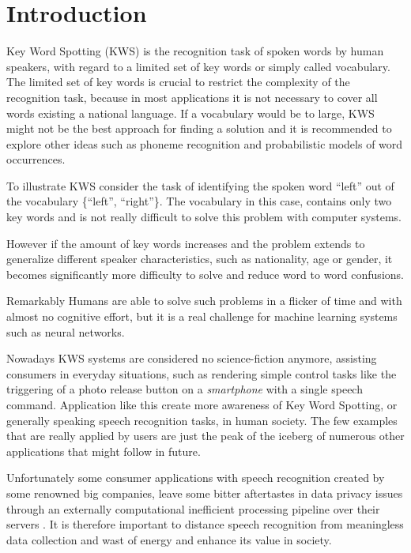 
\chapter{Introduction}\label{sec:intro}
Key Word Spotting (KWS) is the recognition task of spoken words by human speakers, with regard to a limited set of key words or simply called vocabulary.
The limited set of key words is crucial to restrict the complexity of the recognition task, because in most applications it is not necessary to cover all words existing a national language.
If a vocabulary would be to large, KWS might not be the best approach for finding a solution and it is recommended to explore other ideas such as phoneme recognition and probabilistic models of word occurrences.

To illustrate KWS consider the task of identifying the spoken word \enquote{left} out of the vocabulary \{\enquote{left}, \enquote{right}\}.
The vocabulary in this case, contains only two key words and is not really difficult to solve this problem with computer systems.

However if the amount of key words increases and the problem extends to generalize different speaker characteristics, such as nationality, age or gender, it becomes significantly more difficulty to solve and reduce word to word confusions.

Remarkably Humans are able to solve such problems in a flicker of time and with almost no cognitive effort, but it is a real challenge for machine learning systems such as neural networks.

Nowadays KWS systems are considered no science-fiction anymore, assisting consumers in everyday situations, such as rendering simple control tasks like the triggering of a photo release button on a \emph{smartphone} with a single speech command.
Application like this create more awareness of Key Word Spotting, or generally speaking speech recognition tasks, in human society.
The few examples that are really applied by users are just the peak of the iceberg of numerous other applications that might follow in future.

Unfortunately some consumer applications with speech recognition created by some renowned big companies, leave some bitter aftertastes in data privacy issues through an externally computational inefficient processing pipeline over their servers \cite{Tang2018}.
It is therefore important to distance speech recognition from meaningless data collection and wast of energy and enhance its value in society.

